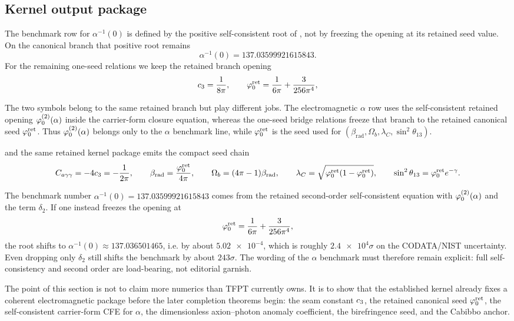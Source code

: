 \subsection{Kernel output package}

The benchmark row for $\alpha^{-1}(0)$ is defined by the positive self-consistent root of , not by freezing the opening at its retained seed value. On the canonical branch that positive root remains
\[
\alpha^{-1}(0)=\num{137.03599921615843}.
\]
For the remaining one-seed relations we keep the retained branch opening
\begin{equation}
\label{eq:hard-kernel-values}
c_3=\frac{1}{8\pi},
\qquad
\varphi_0^{\mathrm{ret}}=\frac{1}{6\pi}+\frac{3}{256\pi^4},
\end{equation}
\begin{remark}
The two symbols belong to the same retained branch but play different jobs. The electromagnetic $\alpha$ row uses the self-consistent retained opening $\varphi_0^{(2)}(\alpha)$ inside the carrier-form closure equation, whereas the one-seed bridge relations freeze that branch to the retained canonical seed $\varphi_0^{\mathrm{ret}}$. Thus $\varphi_0^{(2)}(\alpha)$ belongs only to the $\alpha$ benchmark line, while $\varphi_0^{\mathrm{ret}}$ is the seed used for $(\beta_{\mathrm{rad}},\Omega_b,\lambda_C,\sin^2\theta_{13})$.
\end{remark}
and the same retained kernel package emits the compact seed chain
\begin{equation}
\label{eq:kernel-benchmark-formulas}
C_{a\gamma\gamma}=-4c_3=-\frac{1}{2\pi},
\qquad
\beta_{\mathrm{rad}}=\frac{\varphi_0^{\mathrm{ret}}}{4\pi},
\qquad
\Omega_b=(4\pi-1)\beta_{\mathrm{rad}},
\qquad
\lambda_C=\sqrt{\varphi_0^{\mathrm{ret}}(1-\varphi_0^{\mathrm{ret}})},
\qquad
\sin^2\theta_{13}=\varphi_0^{\mathrm{ret}} e^{-\gamma}.
\end{equation}
\begin{remark}
The benchmark number $\alpha^{-1}(0)=\num{137.03599921615843}$ comes from the retained second-order self-consistent equation with $\varphi_0^{(2)}(\alpha)$ and the term $\delta_2$. If one instead freezes the opening at
\[
\varphi_0^{\mathrm{ret}}=\frac{1}{6\pi}+\frac{3}{256\pi^4},
\]
the root shifts to $\alpha^{-1}(0)\approx \num{137.036501465}$, i.e. by about $\num{5.02e-4}$, which is roughly $\num{2.4e4}\sigma$ on the CODATA/NIST uncertainty. Even dropping only $\delta_2$ still shifts the benchmark by about $243\sigma$. The wording of the $\alpha$ benchmark must therefore remain explicit: full self-consistency and second order are load-bearing, not editorial garnish.
\end{remark}
\begin{tcolorbox}[colback=blue!3, colframe=blue!50!black, breakable,
    title={\textbf{Kernel-output package}}, fonttitle=\bfseries]
The point of this section is not to claim more numerics than TFPT currently owns. It is to show that the established kernel already fixes a coherent electromagnetic package before the later completion theorems begin: the seam constant $c_3$, the retained canonical seed $\varphi_0^{\mathrm{ret}}$, the self-consistent carrier-form CFE for $\alpha$, the dimensionless axion--photon anomaly coefficient, the birefringence seed, and the Cabibbo anchor.
\end{tcolorbox}

